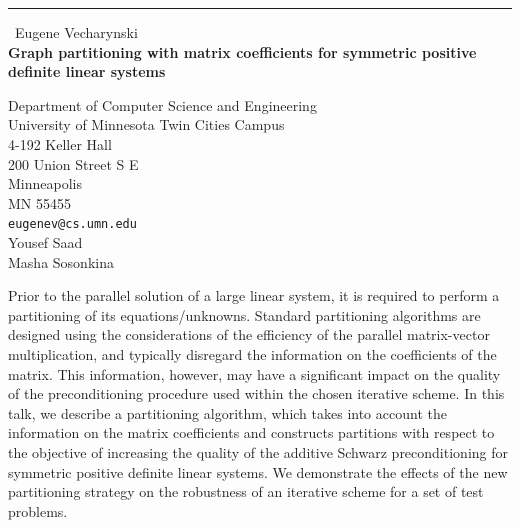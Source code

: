 \documentclass{report}
\begin{document}
\begin{center}
\rule{6in}{1pt} \
{\large Eugene Vecharynski \\
{\bf Graph partitioning with matrix coefficients for symmetric positive definite linear systems}}

Department of Computer Science and Engineering \\ University of Minnesota Twin Cities Campus \\ 4-192 Keller Hall \\ 200 Union Street S E \\ Minneapolis \\ MN 55455
\\
{\tt eugenev@cs.umn.edu}\\
Yousef Saad\\
Masha Sosonkina\end{center}

Prior to the parallel solution of a large linear system, it is required
to perform a partitioning of its equations/unknowns. Standard
partitioning algorithms are designed using the considerations of the
efficiency of the parallel matrix-vector multiplication, and typically
disregard the information on the coefficients of the matrix.
This information, however, may have a significant impact on the quality
of the preconditioning procedure used within the chosen iterative scheme.
In this talk, we
describe a partitioning algorithm, which takes into account the
information on the matrix coefficients and constructs partitions with
respect to the objective of increasing the quality of the additive
Schwarz preconditioning for symmetric positive definite linear systems.
We demonstrate the effects of the new partitioning strategy
on the robustness of an iterative scheme
for a set of test problems.
\end{document}
